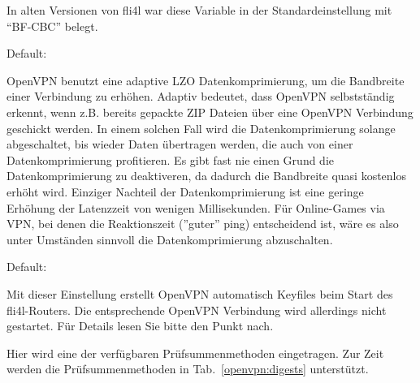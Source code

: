 \begin{description}

  In alten Versionen von fli4l war diese Variable in der Standardeinstellung mit
  ``BF-CBC'' belegt.


  Default: 

  OpenVPN benutzt eine adaptive LZO Datenkomprimierung, um die
  Bandbreite einer Verbindung zu erhöhen. Adaptiv bedeutet, dass
  OpenVPN selbstständig erkennt, wenn z.B. bereits gepackte ZIP
  Dateien über eine OpenVPN Verbindung geschickt werden. In einem
  solchen Fall wird die Datenkomprimierung solange abgeschaltet, bis
  wieder Daten übertragen werden, die auch von einer
  Datenkomprimierung profitieren.  Es gibt fast nie einen Grund die
  Datenkomprimierung zu deaktiveren, da dadurch die Bandbreite quasi
  kostenlos erhöht wird. Einziger Nachteil der Datenkomprimierung ist
  eine geringe Erhöhung der Latenzzeit von wenigen Millisekunden. Für
  Online-Games via VPN, bei denen die Reaktionszeit (''guter'' ping)
  entscheidend ist, wäre es also unter Umständen sinnvoll die
  Datenkomprimierung abzuschalten.


  Default: 

  Mit dieser Einstellung erstellt OpenVPN automatisch Keyfiles beim
  Start des fli4l-Routers. Die entsprechende OpenVPN Verbindung wird
  allerdings nicht gestartet. Für Details lesen Sie bitte den Punkt
   nach.


  Hier wird eine der verfügbaren Prüfsummenmethoden eingetragen. Zur Zeit
  werden die Prüfsummenmethoden in Tab.~\ref{openvpn:digests} unterstützt.


\end{description}
